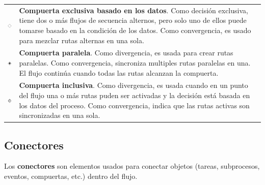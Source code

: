	\begin{tabular}{| m{} m{} | }%
		\rowcolor[gray]{0.97}%
		\centering\noindent\includegraphics[width=25pt]{images/procesos/bpmn/ExclusiveGateway.png} & {\bf Compuerta exclusiva basado en los datos}. Como decisión exclusiva, tiene dos o más flujos de secuencia alternos, pero solo uno de ellos puede tomarse basado en la condición de los datos. Como convergencia, es usado para mezclar rutas alternas en una sola. \\
		\centering\noindent\includegraphics[width=25pt]{images/procesos/bpmn/ParallelGateway.png} & {\bf Compuerta paralela}. Como divergencia, es usada para crear rutas paralelas. Como convergencia, sincroniza multiples rutas paralelas en una. El flujo continúa cuando todas las rutas alcanzan la compuerta. \\
		\rowcolor[gray]{0.97}%
		\centering\noindent\includegraphics[width=25pt]{images/procesos/bpmn/InclusiveGateway.png} & {\bf Compuerta inclusiva}. Como divergencia, es usada cuando en un punto del flujo una o más rutas puden ser activadas y la decisión está basada en los datos del proceso. Como convergencia, indica que las rutas activas son sincronizadas en una sola.
	\end{tabular}%

\subsection{Conectores}

Los {\bf conectores} son elementos usados para conectar objetos (tareas, subprocesos, eventos, compuertas, etc.) dentro del flujo.\\

